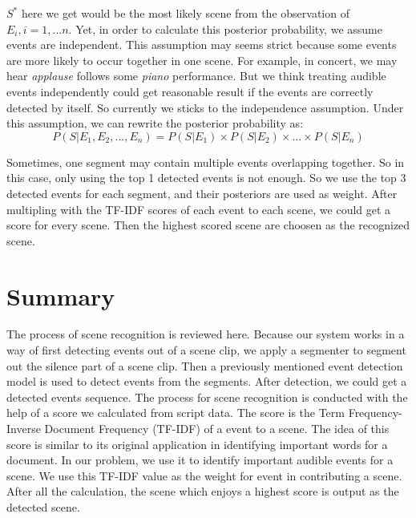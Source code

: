 $S^*$ here we get would be the most likely scene from the observation of $E_i, i = 1,...n$.  
Yet, in order to calculate this posterior probability, we assume events are independent. 
This assumption may seems strict because some events are more likely to occur together in one scene. 
For example, in concert, we may hear \textit{applause} follows some \textit{piano} performance. 
But we think treating audible events independently could get reasonable result if the events are correctly detected by itself. 
So currently we sticks to the independence assumption. 
Under this assumption, we can rewrite the posterior probability as: 
\begin{equation}
P(S|E_1,E_2,...,E_n) = P(S|E_1) \times P(S|E_2) \times ... \times P(S|E_n)
\end{equation}

Sometimes, one segment may contain multiple events overlapping together. 
So in this case, only using the top 1 detected events is not enough. 
So we use the top 3 detected events for each segment, and their posteriors are used as weight. 
After multipling with the TF-IDF scores of each event to each scene, we could get a score for every scene. 
Then the highest scored scene are choosen as the recognized scene. 

\section{Summary}
The process of scene recognition is reviewed here. 
Because our system works in a way of first detecting events out of a scene clip, we apply a segmenter to segment out the silence part of a scene clip. 
Then a previously mentioned event detection model is used to detect events from the segments. 
After detection, we could get a detected events sequence. 
The process for scene recognition is conducted with the help of a score we calculated from script data. 
The score is the Term Frequency-Inverse Document Frequency (TF-IDF) of a event to a scene. 
The idea of this score is similar to its original application in identifying important words for a document. 
In our problem, we use it to identify important audible events for a scene. 
We use this TF-IDF value as the weight for event in contributing a scene. 
After all the calculation, the scene which enjoys a highest score is output as the detected scene. 
